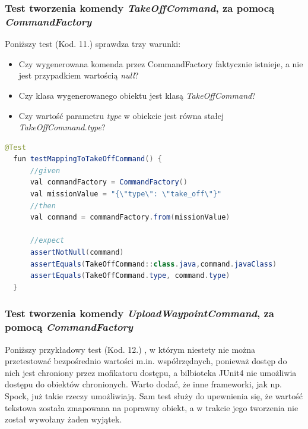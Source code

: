 \subsubsection{Test tworzenia komendy \textit{TakeOffCommand}, za pomocą \textit{CommandFactory}}
Poniższy test (Kod. 11.) sprawdza trzy warunki: 
\begin{itemize}
  \item Czy wygenerowana komenda przez CommandFactory faktycznie istnieje, a nie jest przypadkiem wartością \textit{null}?
  \item Czy klasa wygenerowanego obiektu jest klasą \textit{TakeOffCommand}?
  \item Czy wartość parametru \textit{type} w obiekcie jest równa stałej \textit{TakeOffCommand.type}?
\end{itemize}

\begin{lstlisting}[language=Java, caption=Test tworzenia komendy \textit{TakeOffCommand}\, za pomocą \textit{CommandFactory}]
  @Test
  fun testMappingToTakeOffCommand() {
      //given
      val commandFactory = CommandFactory()
      val missionValue = "{\"type\": \"take_off\"}"
      //then
      val command = commandFactory.from(missionValue)

      //expect
      assertNotNull(command)
      assertEquals(TakeOffCommand::class.java,command.javaClass)
      assertEquals(TakeOffCommand.type, command.type)
  }
\end{lstlisting}



\newpage
\subsubsection{Test tworzenia komendy \textit{UploadWaypointCommand}, za pomocą \textit{CommandFactory}}
Poniższy przykładowy test (Kod. 12.) , w którym niestety nie można przetestować bezpośrednio wartości m.in. współrzędnych, ponieważ dostęp do nich jest chroniony przez mofikatoru dostępu, a bilbioteka JUnit4 nie umożliwia dostępu do obiektów chronionych. Warto dodać, że inne frameworki, jak np. Spock, już takie rzeczy umożliwiają. Sam test służy do upewnienia się, że wartość tekstowa została zmapowana na poprawny obiekt, a w trakcie jego tworzenia nie został wywołany żaden wyjątek.

